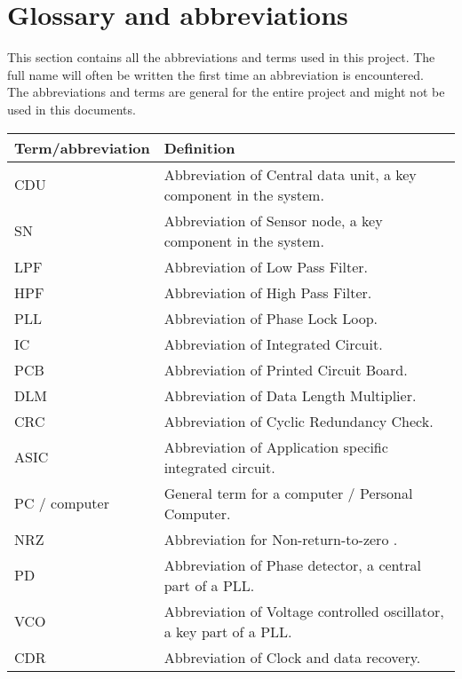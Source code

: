 \section{Glossary and abbreviations}
This section contains all the abbreviations and terms used in this project. The full name will often be written the first time an abbreviation is encountered.\\
The abbreviations and terms are general for the entire project and might not be used in this documents.
\begin{table}[H]
\centering
\begin{tabular}{|p{4cm}|p{7cm}|}
\hline
Term/abbreviation & Definition\\ \hline
CDU & Abbreviation of Central data unit, a key component in the system.\\ \hline
SN & Abbreviation of Sensor node, a key component in the system.\\ \hline
LPF & Abbreviation of Low Pass Filter. \\ \hline
HPF & Abbreviation of High Pass Filter. \\ \hline
PLL & Abbreviation of Phase Lock Loop. \\ \hline
IC & Abbreviation of Integrated Circuit. \\ \hline
PCB & Abbreviation of Printed Circuit Board. \\ \hline
DLM & Abbreviation of Data Length Multiplier. \\ \hline
CRC & Abbreviation of Cyclic Redundancy Check. \\ \hline
ASIC & Abbreviation of Application specific integrated circuit.\\ \hline
PC / computer & General term for a computer / Personal Computer.\\ \hline
NRZ & Abbreviation for Non-return-to-zero \cite{WikipediaNRZ}.\\
PD & Abbreviation of Phase detector, a central part of a PLL.\\ \hline
VCO & Abbreviation of Voltage controlled oscillator, a key part of a PLL.\\ \hline
CDR & Abbreviation of Clock and data recovery. \\ \hline
\end{tabular}
\end{table}